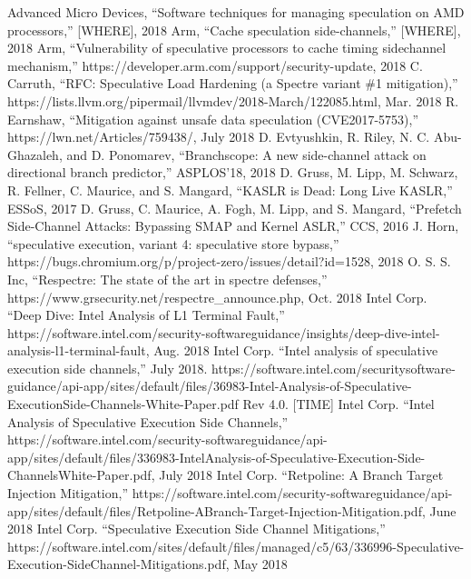 \begin{thebibliography}{00}
     Advanced Micro Devices, ``Software techniques for managing speculation on AMD processors,'' [WHERE], 2018
     Arm, ``Cache speculation side-channels,'' [WHERE], 2018
     Arm, ``Vulnerability of speculative processors to cache timing sidechannel mechanism,'' https://developer.arm.com/support/security-update, 2018
     C. Carruth, ``RFC: Speculative Load Hardening (a Spectre variant \#1 mitigation),'' https://lists.llvm.org/pipermail/llvmdev/2018-March/122085.html, Mar. 2018
     R. Earnshaw, ``Mitigation against unsafe data speculation (CVE2017-5753),'' https://lwn.net/Articles/759438/, July 2018
     D. Evtyushkin, R. Riley, N. C. Abu-Ghazaleh, and D. Ponomarev, ``Branchscope: A new side-channel attack on directional branch predictor,'' ASPLOS’18, 2018
     D. Gruss, M. Lipp, M. Schwarz, R. Fellner, C. Maurice, and S. Mangard, ``KASLR is Dead: Long Live KASLR,'' ESSoS, 2017
     D. Gruss, C. Maurice, A. Fogh, M. Lipp, and S. Mangard, ``Prefetch Side-Channel Attacks: Bypassing SMAP and Kernel ASLR,'' CCS, 2016
     J. Horn, ``speculative execution, variant 4: speculative store bypass,'' https://bugs.chromium.org/p/project-zero/issues/detail?id=1528, 2018
     O. S. S. Inc, ``Respectre: The state of the art in spectre defenses,'' https://www.grsecurity.net/respectre\_announce.php, Oct. 2018
     Intel Corp. ``Deep Dive: Intel Analysis of L1 Terminal Fault,'' https://software.intel.com/security-softwareguidance/insights/deep-dive-intel-analysis-l1-terminal-fault, Aug. 2018
     Intel Corp. ``Intel analysis of speculative execution side channels,'' July 2018. https://software.intel.com/securitysoftware-guidance/api-app/sites/default/files/36983-Intel-Analysis-of-Speculative-ExecutionSide-Channels-White-Paper.pdf Rev 4.0. [TIME]
     Intel Corp. ``Intel Analysis of Speculative Execution Side Channels,'' https://software.intel.com/security-softwareguidance/api-app/sites/default/files/336983-IntelAnalysis-of-Speculative-Execution-Side-ChannelsWhite-Paper.pdf, July 2018
     Intel Corp. ``Retpoline: A Branch Target Injection Mitigation,'' https://software.intel.com/security-softwareguidance/api-app/sites/default/files/Retpoline-ABranch-Target-Injection-Mitigation.pdf, June 2018
     Intel Corp. ``Speculative Execution Side Channel Mitigations,'' https://software.intel.com/sites/default/files/managed/c5/63/336996-Speculative-Execution-SideChannel-Mitigations.pdf, May 2018

\end{thebibliography}
